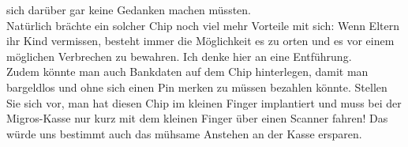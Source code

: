 sich darüber gar keine Gedanken machen müssten.\\Natürlich brächte ein solcher Chip noch viel mehr Vorteile mit sich: Wenn Eltern ihr Kind vermissen, besteht immer die Möglichkeit es zu orten und es vor einem möglichen Verbrechen zu bewahren. Ich denke hier an eine Entführung. \\Zudem könnte man auch Bankdaten auf dem Chip hinterlegen, damit man bargeldlos und ohne sich einen Pin merken zu müssen bezahlen könnte. Stellen Sie sich vor, man hat diesen Chip im kleinen Finger implantiert und muss bei der Migros-Kasse nur kurz mit dem kleinen Finger über einen Scanner fahren! Das würde uns bestimmt auch das mühsame Anstehen an der Kasse ersparen.